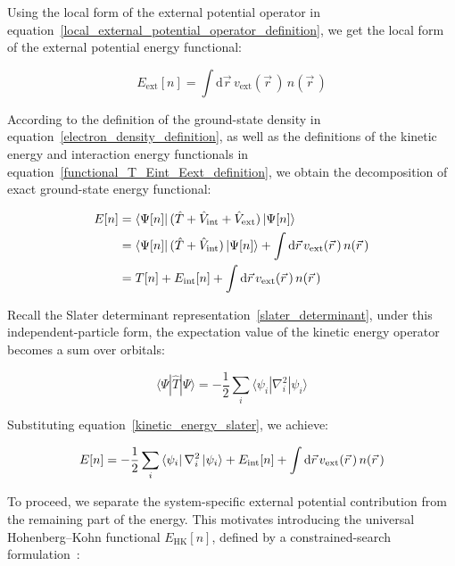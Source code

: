 Using the local form of the external potential operator in equation~\eqref{local_external_potential_operator_definition}, we get the local form of the external potential energy functional:

\begin{equation}
    E_\mathrm{ext}[n]=\int\mathrm{d}\vec{r}\,v_\mathrm{ext}(\vec{r}\,)\,n(\vec{r}\,)
\label{functional_Eext_local_form}
\end{equation}

According to the definition of the ground-state density in equation~\eqref{electron_density_definition},
as well as the definitions of the kinetic energy and interaction energy functionals in equation~\eqref{functional_T_Eint_Eext_definition},
we obtain the decomposition of exact ground-state energy functional:

\begin{equation}
\begin{aligned}
E[n]
&= \bra{\Psi[n]}(\hat{T}+\hat{V}_\mathrm{int}+\hat{V}_\mathrm{ext})\ket{\Psi[n]} \\
&= \bra{\Psi[n]}(\hat{T}+\hat{V}_\mathrm{int})\ket{\Psi[n]}
 + \int\mathrm{d}\vec{r}\,v_\mathrm{ext}(\vec{r}\,)\,n(\vec{r}\,) \\
&= T[n]+E_\mathrm{int}[n]+\int\mathrm{d}\vec{r}\,v_\mathrm{ext}(\vec{r}\,)\,n(\vec{r}\,)
\end{aligned}
\label{energy_density_functional_decomposition}
\end{equation}

Recall the Slater determinant representation~\eqref{slater_determinant},
under this independent-particle form, the expectation value of the kinetic energy operator becomes a sum over orbitals:

\begin{equation}
\langle\Psi|\hat{T}|\Psi\rangle
= -\frac{1}{2}\sum_i \langle\psi_i|\nabla_i^2|\psi_i\rangle
\label{kinetic_energy_slater}
\end{equation}

Substituting equation~\eqref{kinetic_energy_slater}, we achieve:

\begin{equation}
E[n]=-\frac{1}{2}\sum_i\bra{\psi_i}\nabla_i^2\ket{\psi_i}+E_\mathrm{int}[n]+\int\mathrm{d}\vec{r}\,v_\mathrm{ext}(\vec{r}\,)\,n(\vec{r}\,)
\label{total_energy_functional_decomposition}
\end{equation}

To proceed, we separate the system-specific external potential contribution from the remaining part of the energy.
This motivates introducing the universal Hohenberg--Kohn functional $E_\mathrm{HK}[n]$, defined by a constrained-search formulation~\cite{levy1979universal,engel2011density}:

